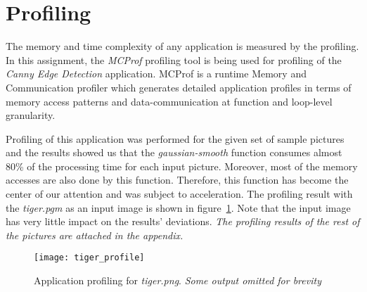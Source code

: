 \section{Profiling}
\label{sec:profiling}
The memory and time complexity of any application is measured by the profiling. In this assignment, the \emph{MCProf} profiling tool is being used for profiling of the \emph{Canny Edge Detection} application. MCProf is a runtime Memory and Communication profiler which generates detailed application profiles in terms of memory access patterns and data-communication at function and loop-level granularity.

Profiling of this application was performed for the given set of sample pictures and the results showed us that the \emph{gaussian-smooth} function consumes almost 80\% of the processing time for each input picture. Moreover, most of the memory accesses are also done by this function. Therefore, this function has become the center of our attention and was subject to acceleration. The profiling result with the \emph{tiger.pgm} as an input image is shown in figure~\ref{fig:prof}. Note that the input image has very little impact on the results' deviations.
\textit{The profiling results of the rest of the pictures are attached in the appendix.}

\begin{figure}
\centering
\texttt{[image: tiger\_profile]}
\caption{Application profiling for \textit{tiger.png}. \textit{Some output omitted for brevity}}
\label{fig:prof}
\end{figure}